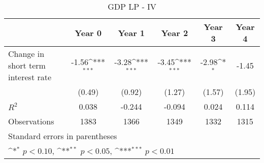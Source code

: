 \documentclass{article}
\begin{document}
\begin{table}[htbp]\centering
\def\sym#1{\ifmmode^{#1}\else\(^{#1}\)\fi}
\caption{GDP LP - IV}
\begin{tabular}{l*{5}{c}}
\hline\hline
                    &\multicolumn{1}{c}{Year 0}&\multicolumn{1}{c}{Year 1}&\multicolumn{1}{c}{Year 2}&\multicolumn{1}{c}{Year 3}&\multicolumn{1}{c}{Year 4}\\
\hline
Change in short term interest rate&       -1.56\sym{***}&       -3.28\sym{***}&       -3.45\sym{***}&       -2.98\sym{*}  &       -1.45         \\
                    &      (0.49)         &      (0.92)         &      (1.27)         &      (1.57)         &      (1.95)         \\
\hline
\(R^{2}\)           &       0.038         &      -0.244         &      -0.094         &       0.024         &       0.114         \\
Observations        &        1383         &        1366         &        1349         &        1332         &        1315         \\
\hline\hline
\multicolumn{6}{l}{\footnotesize Standard errors in parentheses}\\
\multicolumn{6}{l}{\footnotesize \sym{*} \(p<0.10\), \sym{**} \(p<0.05\), \sym{***} \(p<0.01\)}\\
\end{tabular}
\end{table}
\end{document}
